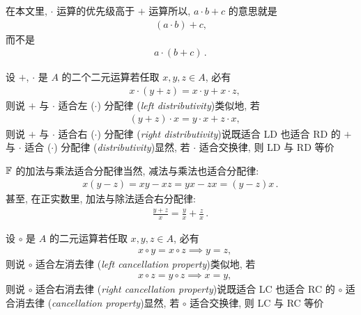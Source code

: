 \begin{remark}
    在本文里, $\cdot$ 运算的优先级高于 $+$ 运算\period 所以, $a \cdot b + c$ 的意思就是
    \begin{align*}
        (a \cdot b) + c,
    \end{align*}
    而不是
    \begin{align*}
        a \cdot (b + c)\period
    \end{align*}
\end{remark}

\begin{definition}
    设 $+$, $\cdot$ 是 $A$ 的二个二元运算\period 若任取 $x,y,z \in A$, 必有
    \begin{align*}
         & x \cdot (y + z) = x \cdot y + x \cdot z, \tag*{(LD)}
    \end{align*}
    则说 $+$ 与 $\cdot$ 适合左 ($\cdot$) 分配律 (\textit{left distributivity})\period 类似地, 若
    \begin{align*}
         & (y + z) \cdot x = y \cdot x + z \cdot x, \tag*{(RD)}
    \end{align*}
    则说 $+$ 与 $\cdot$ 适合右 ($\cdot$) 分配律 (\textit{right distributivity})\period 说既适合 LD 也适合 RD 的 $+$ 与 $\cdot$ 适合 ($\cdot$) 分配律 (\textit{distributivity})\period 显然, 若 $\cdot$ 适合交换律, 则 LD 与 RD 等价\period
\end{definition}

\begin{example}
    $\mathbb{F}$ 的加法与乘法适合分配律\period 当然, 减法与乘法也适合分配律:
    \begin{align*}
        x(y-z) = xy - xz = yx - zx = (y-z)x \period
    \end{align*}
    甚至, 在正实数里, 加法与除法适合右分配律:
    \begin{align*}
        \frac{y+z}{x} = \frac{y}{x} + \frac{z}{x} \period
    \end{align*}
\end{example}

\begin{definition}
    设 $\circ$ 是 $A$ 的二元运算\period 若任取 $x,y,z \in A$, 必有
    \begin{align*}
         & x \circ y = x \circ z \implies y = z, \tag*{(LC)}
    \end{align*}
    则说 $\circ$ 适合左消去律 (\textit{left cancellation property})\period 类似地, 若
    \begin{align*}
         & x \circ z = y \circ z \implies x = y, \tag*{(RC)}
    \end{align*}
    则说 $\circ$ 适合右消去律 (\textit{right cancellation property})\period 说既适合 LC 也适合 RC 的 $\circ$ 适合消去律 (\textit{cancellation property})\period 显然, 若 $\circ$ 适合交换律, 则 LC 与 RC 等价\period
\end{definition}

